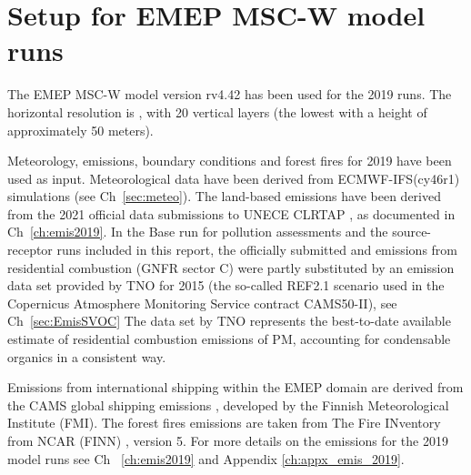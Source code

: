 \section{Setup for EMEP MSC-W model runs}
\label{Mod_2019}

The EMEP MSC-W model version rv4.42 has been used for the 2019
runs. The horizontal resolution is \resZO, with 20 vertical layers
(the lowest with a height of approximately 50 meters).

 Meteorology, emissions, boundary conditions and forest fires for 2019 have been
 used as input. Meteorological data have been
 derived from ECMWF-IFS(cy46r1) simulations (see Ch~\ref{sec:meteo}). The
 land-based emissions have been derived from the 2021 official data
 submissions to UNECE CLRTAP \citep{CEIP2021}, as documented in
 Ch~\ref{ch:emis2019}. In the Base run for pollution assessments and the source-receptor runs included in this report, the officially submitted \PM[10] and \PM[2.5] emissions from residential combustion (GNFR sector C) were partly substituted by an emission data set provided by TNO for 2015 (the so-called REF2.1 scenario used in the Copernicus Atmosphere Monitoring Service contract CAMS50-II), see Ch~\ref{sec:EmisSVOC} The data set by TNO represents the best-to-date available estimate of residential combustion emissions of PM, accounting for condensable organics in a consistent way. 
 
 Emissions from international shipping
 within the EMEP domain are derived from the CAMS global shipping
 emissions \citep{CAMSemis2019}, developed by the Finnish
 Meteorological Institute (FMI). The forest fires emissions are taken from
 The Fire INventory from NCAR (FINN) \citep{Wiedinmyer2011}, version 5.
 For more details on the emissions for the 2019 model runs see Ch~ \ref{ch:emis2019} and Appendix \ref{ch:appx_emis_2019}.


 
